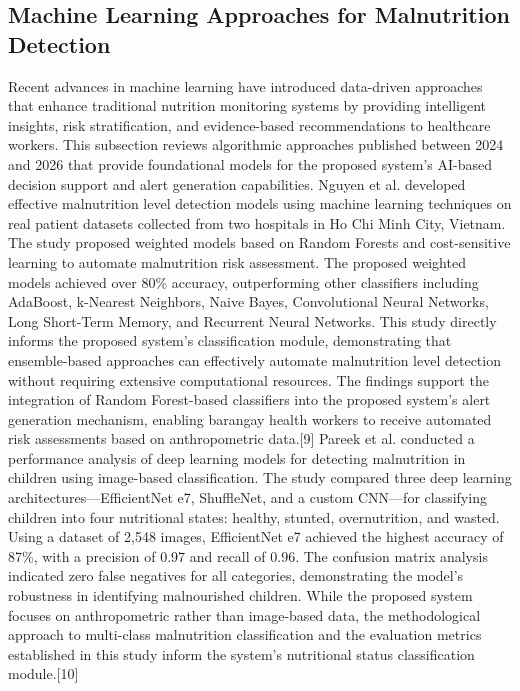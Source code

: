 \documentclass[12pt, a4paper]{report}
\begin{document}
\subsection{Machine Learning Approaches for Malnutrition Detection}
Recent advances in machine learning have introduced data-driven approaches that enhance traditional nutrition monitoring systems by providing intelligent insights, risk stratification, and evidence-based recommendations to healthcare workers. This subsection reviews algorithmic approaches published between 2024 and 2026 that provide foundational models for the proposed system's AI-based decision support and alert generation capabilities.
Nguyen et al. developed effective malnutrition level detection models using machine learning techniques on real patient datasets collected from two hospitals in Ho Chi Minh City, Vietnam. The study proposed weighted models based on Random Forests and cost-sensitive learning to automate malnutrition risk assessment. The proposed weighted models achieved over 80\% accuracy, outperforming other classifiers including AdaBoost, k-Nearest Neighbors, Naive Bayes, Convolutional Neural Networks, Long Short-Term Memory, and Recurrent Neural Networks. This study directly informs the proposed system's classification module, demonstrating that ensemble-based approaches can effectively automate malnutrition level detection without requiring extensive computational resources. The findings support the integration of Random Forest-based classifiers into the proposed system's alert generation mechanism, enabling barangay health workers to receive automated risk assessments based on anthropometric data.[9] 
Pareek et al. conducted a performance analysis of deep learning models for detecting malnutrition in children using image-based classification. The study compared three deep learning architectures—EfficientNet e7, ShuffleNet, and a custom CNN—for classifying children into four nutritional states: healthy, stunted, overnutrition, and wasted. Using a dataset of 2,548 images, EfficientNet e7 achieved the highest accuracy of 87\%, with a precision of 0.97 and recall of 0.96. The confusion matrix analysis indicated zero false negatives for all categories, demonstrating the model's robustness in identifying malnourished children. While the proposed system focuses on anthropometric rather than image-based data, the methodological approach to multi-class malnutrition classification and the evaluation metrics established in this study inform the system's nutritional status classification module.[10] 
\end{document}
